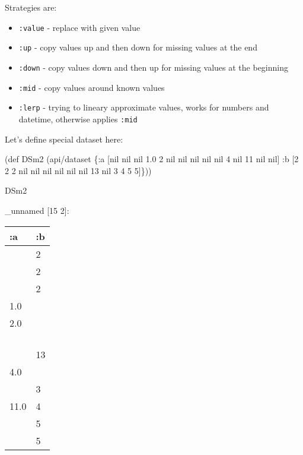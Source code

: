 \documentclass[]{article}
\newenvironment{Shaded}{\begin{snugshade}}{\end{snugshade}}
\newcommand{\AttributeTok}[1]{\textcolor[rgb]{0.77,0.63,0.00}{#1}}
\newcommand{\BuiltInTok}[1]{#1}
\newcommand{\DecValTok}[1]{\textcolor[rgb]{0.00,0.00,0.81}{#1}}
\newcommand{\FloatTok}[1]{\textcolor[rgb]{0.00,0.00,0.81}{#1}}
\newcommand{\FunctionTok}[1]{\textcolor[rgb]{0.00,0.00,0.00}{#1}}
\newcommand{\NormalTok}[1]{#1}
\newcommand{\VariableTok}[1]{\textcolor[rgb]{0.00,0.00,0.00}{#1}}
\providecommand{\tightlist}{%
  \setlength{\itemsep}{0pt}\setlength{\parskip}{0pt}}
\begin{document}
Strategies are:

\begin{itemize}
\tightlist
\item
  \texttt{:value} - replace with given value
\item
  \texttt{:up} - copy values up and then down for missing values at the
  end
\item
  \texttt{:down} - copy values down and then up for missing values at
  the beginning
\item
  \texttt{:mid} - copy values around known values
\item
  \texttt{:lerp} - trying to lineary approximate values, works for
  numbers and datetime, otherwise applies \texttt{:mid}
\end{itemize}

Let's define special dataset here:

\begin{Shaded}
\begin{Highlighting}[]
\NormalTok{(}\BuiltInTok{def}\FunctionTok{ DSm2 }\NormalTok{(api/dataset \{}\AttributeTok{:a}\NormalTok{ [}\VariableTok{nil} \VariableTok{nil} \VariableTok{nil} \FloatTok{1.0} \DecValTok{2}  \VariableTok{nil} \VariableTok{nil} \VariableTok{nil} \VariableTok{nil}  \VariableTok{nil} \DecValTok{4}   \VariableTok{nil}  \DecValTok{11} \VariableTok{nil} \VariableTok{nil}\NormalTok{]}
                        \AttributeTok{:b}\NormalTok{ [}\DecValTok{2}   \DecValTok{2}   \DecValTok{2} \VariableTok{nil} \VariableTok{nil} \VariableTok{nil} \VariableTok{nil} \VariableTok{nil} \VariableTok{nil} \DecValTok{13}   \VariableTok{nil}   \DecValTok{3}  \DecValTok{4}  \DecValTok{5} \DecValTok{5}\NormalTok{]\}))}
\end{Highlighting}
\end{Shaded}

\begin{Shaded}
\begin{Highlighting}[]
\NormalTok{DSm2}
\end{Highlighting}
\end{Shaded}

\_unnamed {[}15 2{]}:

\begin{longtable}[]{@{}ll@{}}
\toprule
:a & :b\tabularnewline
\midrule
\endhead
& 2\tabularnewline
& 2\tabularnewline
& 2\tabularnewline
1.0 &\tabularnewline
2.0 &\tabularnewline
&\tabularnewline
&\tabularnewline
&\tabularnewline
&\tabularnewline
& 13\tabularnewline
4.0 &\tabularnewline
& 3\tabularnewline
11.0 & 4\tabularnewline
& 5\tabularnewline
& 5\tabularnewline
\bottomrule
\end{longtable}
\end{document}
